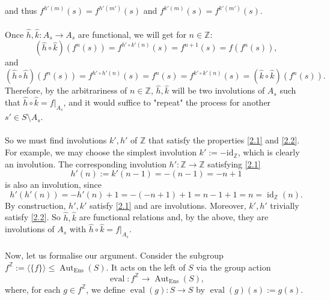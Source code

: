 \documentclass[11pt, a4paper, oneside]{article}
\theoremstyle{remark}
\theoremstyle{lemma}
\begin{document}
and thus \( f^{h'\left(m\right)}\left(s\right) = f^{h'\left(m'\right)}\left(s\right) \) and \( f^{k'\left(m\right)}\left(s\right) = f^{k'\left(m'\right)}\left(s\right) \).
\\\\
Once \( \hat{h}, \hat{k} : A_s \rightarrow A_s \) are functional, we will get for \( n \in \mathbb{Z} \):
\[
\left(\hat{h} \circ \hat{k}\right)\left(f^n\left(s\right)\right) = f^{h'\circ k'\left(n\right)}\left(s\right) = f^{n+1}\left(s\right) = f\left(f^n\left(s\right)\right),
\]
and
\[
\left(\hat{h} \circ \hat{h}\right)\left(f^n\left(s\right)\right) = f^{h'\circ h'\left(n\right)}\left(s\right) = f^n\left(s\right) = f^{k'\circ k'\left(n\right)}\left(s\right) = \left(\hat{k} \circ \hat{k}\right)\left(f^n\left(s\right)\right).
\]
Therefore, by the arbitrariness of \( n \in \mathbb{Z} \), \(\hat{h},\hat{k}\) will be two involutions of \( A_s \) such that \( \hat{h} \circ \hat{k} = f|_{A_s} \), and it would suffice to "repeat" the process for another \( s' \in S \setminus A_s \).
\\\\
So we must find involutions \( k', h' \) of \( \mathbb{Z} \) that satisfy the properties \eqref{2.1} and \eqref{2.2}. For example, we may choose the simplest involution \(k':=-\mathrm{id}_{\mathbb{Z}}\), which is clearly an involution. The corresponding involution \( h': \mathbb{Z} \rightarrow \mathbb{Z} \) satisfying \eqref{2.1}
\[
h'\left(n\right) := k'\left(n - 1\right) = -\left(n - 1\right) = -n + 1
\]
is also an involution, since
\[
h'\left(h'\left(n\right)\right) = -h'\left(n\right) + 1 = -\left(-n + 1\right) + 1 = n - 1 + 1 = n = \operatorname{id}_{\mathbb{Z}}\left(n\right).
\]
By construction, \( h', k' \) satisfy \eqref{2.1} and are involutions. Moreover, \( k', h' \) trivially satisfy \eqref{2.2}. So \( \hat{h}, \hat{k} \) are functional relations and, by the above, they are involutions of \( A_s \) with \( \hat{h} \circ \hat{k} = f|_{A_s} \).
\\\\
Now, let us formalise our argument. Consider the subgroup \( f^{\mathbb{Z}} := \langle \{f\} \rangle \leq \operatorname{Aut}_{\mathrm{Ens}}(S) \). It acts on the left of \( S \) via the group action
\[
\operatorname{eval} : f^{\mathbb{Z}} \longrightarrow \operatorname{Aut}_{\mathrm{Ens}}(S),
\]
where, for each \( g \in f^{\mathbb{Z}} \), we define \( \operatorname{eval}(g) : S \rightarrow S \) by \( \operatorname{eval}(g)(s) := g(s) \).
\\\\
\end{document}
